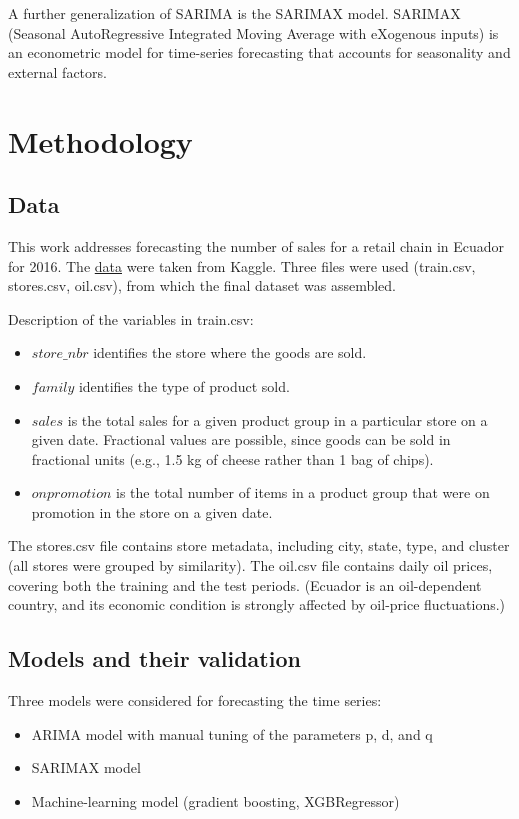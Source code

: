 \documentclass[]{article}
\begin{document}
A further generalization of SARIMA is the SARIMAX model. SARIMAX (Seasonal AutoRegressive Integrated Moving Average with eXogenous inputs) is an econometric model for time-series forecasting that accounts for seasonality and external factors.


\section{Methodology}
\subsection{Data}

This work addresses forecasting the number of sales for a retail chain in Ecuador for 2016. The \href{https://www.kaggle.com/c/store-sales-time-series-forecasting/data}{data} were taken from Kaggle. Three files were used (train.csv, stores.csv, oil.csv), from which the final dataset was assembled.

Description of the variables in train.csv:
\begin{itemize}
	\item $store\_nbr$ identifies the store where the goods are sold.
	\item $family$ identifies the type of product sold.
	\item $sales$ is the total sales for a given product group in a particular store on a given date. Fractional values are possible, since goods can be sold in fractional units (e.g., 1.5 kg of cheese rather than 1 bag of chips).
	\item $onpromotion$ is the total number of items in a product group that were on promotion in the store on a given date.
\end{itemize}

The stores.csv file contains store metadata, including city, state, type, and cluster (all stores were grouped by similarity). The oil.csv file contains daily oil prices, covering both the training and the test periods. (Ecuador is an oil-dependent country, and its economic condition is strongly affected by oil-price fluctuations.)

\subsection{Models and their validation}

Three models were considered for forecasting the time series:
\begin{itemize}
	\item ARIMA model with manual tuning of the parameters p, d, and q
	\item SARIMAX model
	\item Machine-learning model (gradient boosting, XGBRegressor)
\end{itemize}
\end{document}
